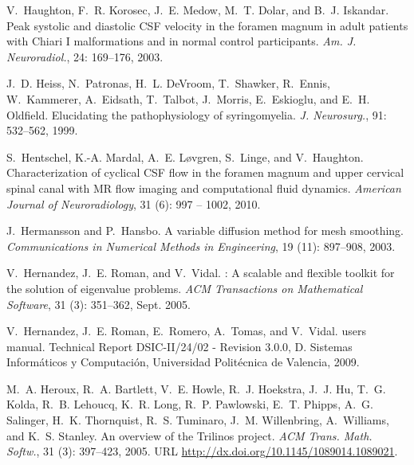 \begin{thebibliography}{467}
V.~Haughton, F.~R. Korosec, J.~E. Medow, M.~T. Dolar, and B.~J. Iskandar.
\newblock Peak systolic and diastolic {CSF} velocity in the foramen magnum in
  adult patients with {C}hiari {I} malformations and in normal control
  participants.
\newblock \emph{Am. J. Neuroradiol.}, 24: 169--176, 2003.

J.~D. Heiss, N.~Patronas, H.~L. DeVroom, T.~Shawker, R.~Ennis, W.~Kammerer,
  A.~Eidsath, T.~Talbot, J.~Morris, E.~Eskioglu, and E.~H. Oldfield.
\newblock Elucidating the pathophysiology of syringomyelia.
\newblock \emph{J. Neurosurg.}, 91: 532--562, 1999.

S.~Hentschel, K.-A. Mardal, A.~E. L{\o}vgren, S.~Linge, and V.~Haughton.
\newblock Characterization of cyclical CSF flow in the foramen magnum and upper
  cervical spinal canal with MR flow imaging and computational fluid dynamics.
\newblock \emph{American Journal of Neuroradiology}, 31 (6):
  997 -- 1002, 2010.

J.~Hermansson and P.~Hansbo.
\newblock A variable diffusion method for mesh smoothing.
\newblock \emph{Communications in Numerical Methods in Engineering},
  19 (11): 897--908, 2003.

V.~Hernandez, J.~E. Roman, and V.~Vidal.
: A scalable and flexible toolkit for the solution of
  eigenvalue problems.
\newblock \emph{ACM Transactions on Mathematical Software}, 31
  (3): 351--362, Sept. 2005.

V.~Hernandez, J.~E. Roman, E.~Romero, A.~Tomas, and V.~Vidal.
 users manual.
\newblock Technical Report DSIC-II/24/02 - Revision 3.0.0, D. Sistemas
  Inform\'aticos y Computaci\'on, Universidad Polit\'ecnica de Valencia, 2009.

M.~A. Heroux, R.~A. Bartlett, V.~E. Howle, R.~J. Hoekstra, J.~J. Hu, T.~G.
  Kolda, R.~B. Lehoucq, K.~R. Long, R.~P. Pawlowski, E.~T. Phipps, A.~G.
  Salinger, H.~K. Thornquist, R.~S. Tuminaro, J.~M. Willenbring, A.~Williams,
  and K.~S. Stanley.
\newblock An overview of the {T}rilinos project.
\newblock \emph{ACM Trans. Math. Softw.}, 31 (3): 397--423,
  2005.
\newblock URL \url{http://dx.doi.org/10.1145/1089014.1089021}.


\end{thebibliography}
